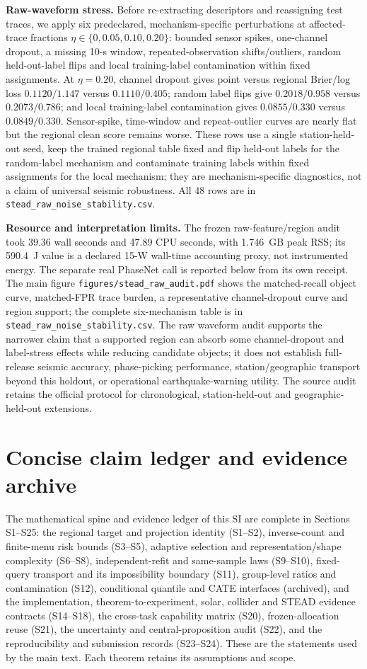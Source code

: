 \documentclass[11pt,a4paper]{article}
\numberwithin{equation}{section}
\theoremstyle{definition}\newtheorem{definition}[theorem]{Definition}
\theoremstyle{remark}\newtheorem{remark}[theorem]{Remark}
\begin{document}
\textbf{Raw-waveform stress.} Before re-extracting descriptors and reassigning test traces, we apply six predeclared, mechanism-specific perturbations at affected-trace fractions $\eta\in\{0,0.05,0.10,0.20\}$: bounded sensor spikes, one-channel dropout, a missing 10-s window, repeated-observation shifts/outliers, random held-out-label flips and local training-label contamination within fixed assignments. At $\eta=0.20$, channel dropout gives point versus regional Brier/log loss $0.1120/1.147$ versus $0.1110/0.405$; random label flips give $0.2018/0.958$ versus $0.2073/0.786$; and local training-label contamination gives $0.0855/0.330$ versus $0.0849/0.330$. Sensor-spike, time-window and repeat-outlier curves are nearly flat but the regional clean score remains worse. These rows use a single station-held-out seed, keep the trained regional table fixed and flip held-out labels for the random-label mechanism and contaminate training labels within fixed assignments for the local mechanism; they are mechanism-specific diagnostics, not a claim of universal seismic robustness. All 48 rows are in \texttt{stead\_raw\_noise\_stability.csv}.

\textbf{Resource and interpretation limits.} The frozen raw-feature/region audit took 39.36 wall seconds and 47.89 CPU seconds, with 1.746~GB peak RSS; its 590.4~J value is a declared 15-W wall-time accounting proxy, not instrumented energy. The separate real PhaseNet call is reported below from its own receipt. The main figure \texttt{figures/stead\_raw\_audit.pdf} shows the matched-recall object curve, matched-FPR trace burden, a representative channel-dropout curve and region support; the complete six-mechanism table is in \texttt{stead\_raw\_noise\_stability.csv}. The raw waveform audit supports the narrower claim that a supported region can absorb some channel-dropout and label-stress effects while reducing candidate objects; it does not establish full-release seismic accuracy, phase-picking performance, station/geographic transport beyond this holdout, or operational earthquake-warning utility. The source audit retains the official protocol for chronological, station-held-out and geographic-held-out extensions.

\section{Concise claim ledger and evidence archive}
\label{sec:archive}
The mathematical spine and evidence ledger of this SI are complete in Sections S1--S25: the regional target and projection identity (S1--S2), inverse-count and finite-menu risk bounds (S3--S5), adaptive selection and representation/shape complexity (S6--S8), independent-refit and same-sample laws (S9--S10), fixed-query transport and its impossibility boundary (S11), group-level ratios and contamination (S12), conditional quantile and CATE interfaces (archived), and the implementation, theorem-to-experiment, solar, collider and STEAD evidence contracts (S14--S18), the cross-task capability matrix (S20), frozen-allocation reuse (S21), the uncertainty and central-proposition audit (S22), and the reproducibility and submission records (S23--S24). These are the statements used by the main text. Each theorem retains its assumptions and scope.
\end{document}
